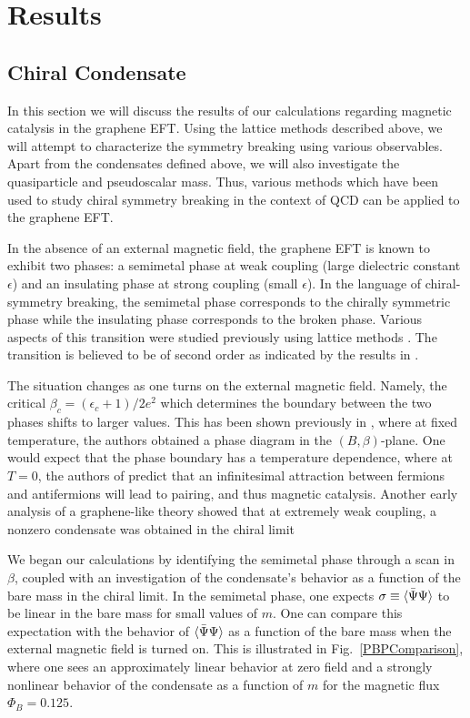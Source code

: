 \documentclass[aps,prd,twocolumn,showpacs,superscriptaddress,groupedaddress]{revtex4}  %
\begin{document}
\section{\label{sec:Results}Results}
\subsection{\label{sec:ChiralCond}Chiral Condensate}
In this section we will discuss the results of our calculations regarding magnetic catalysis in the graphene EFT. Using the lattice methods described above, we will attempt to characterize the symmetry breaking using various observables.
Apart from the condensates defined above, we will also investigate the quasiparticle and pseudoscalar mass. Thus, various methods which have been used to study chiral symmetry breaking in the
context of QCD can be applied to the graphene EFT.

In the absence of an external magnetic field, the graphene EFT is known to exhibit two phases: a semimetal phase at weak coupling (large dielectric constant $\epsilon$) and an insulating phase at strong coupling (small $\epsilon$). 
In the language of chiral-symmetry breaking, the semimetal phase corresponds to the chirally symmetric phase while the insulating phase corresponds to the broken phase.
Various aspects of this transition were studied previously using lattice methods \cite{Drut1, Drut2, Hands1, Giedt}. The transition is believed to be of second order as indicated by the results in \cite{Drut2}. 

The situation changes as one turns on the external magnetic field. Namely, the critical $\beta_c = (\epsilon_c+1)/2e^2$ which determines the boundary between the two phases shifts to larger values. This has been shown previously in \cite{Polikarpov}, where at fixed temperature, the authors
obtained a phase diagram in the $(B, \beta)$-plane. One would expect that the phase boundary has a temperature dependence, where at $T=0$, the authors of \cite{Miransky1,Miransky2,Miransky3,Miransky4,MiranskyGraphene1,MiranskyGraphene2,MiranskyGraphene3} predict that an infinitesimal attraction between fermions and antifermions will lead to pairing, and thus magnetic catalysis. Another early analysis of a graphene-like theory showed that at extremely weak coupling, a nonzero condensate was obtained in the chiral limit \cite{Cosmai}

We began our calculations by identifying the semimetal phase through a scan in $\beta$, coupled with an investigation of the condensate's behavior as a function of the bare mass in the chiral limit. In the semimetal phase, one expects $\sigma \equiv {\langle {\bar \Psi}\Psi \rangle}$ to be linear in the bare mass for small values of $m$. 
One can compare this expectation with the behavior of ${\langle {\bar \Psi} \Psi \rangle}$ as a function of the bare mass when the external magnetic field is turned on. This is illustrated in Fig.~\ref{PBPComparison}, where one sees an approximately linear behavior at zero field and a strongly nonlinear behavior of the condensate as a function of $m$ for the magnetic flux $\Phi_B = 0.125$.
\end{document}
